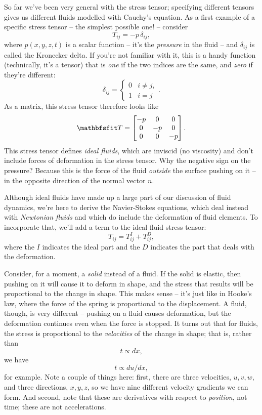 So far we've been very general with the stress tensor; specifying different tensors gives us different fluids modelled with Cauchy's equation.  As a first example of a specific stress tensor -- the simplest possible one! -- consider 
\begin{equation}
T_{ij} = -p \, \delta_{ij},
\end{equation}
where $p(x, y, z, t)$ is a scalar function -- it's the \emph{pressure} in the fluid -- and $\delta_{ij}$ is called the Kronecker delta.  If you're not familiar with it, this is a handy function (technically, it's a tensor) that is \emph{one} if the two indices are the same, and \emph{zero} if they're different:
\[
\delta_{ij} = \begin{cases}
0 & i \neq j, \\
1 & i = j \end{cases}.
\]
As a matrix, this stress tensor therefore looks like
\begin{equation}
\tens{T} = \begin{bmatrix}
-p & 0 & 0 \\
0 & -p & 0 \\
0 & 0 & -p
\end{bmatrix}.
\label{eq_stress_ideal}
\end{equation}
This stress tensor defines \emph{ideal fluids}, which are inviscid (no viscosity) and don't include forces of deformation in the stress tensor.  Why the negative sign on the pressure?  Because this is the force of the fluid \emph{outside} the surface pushing on it -- in the opposite direction of the normal vector $\unit{n}$.

Although ideal fluids have made up a large part of our discussion of fluid dynamics, we're here to derive the Navier-Stokes equations, which deal instead with \emph{Newtonian fluids} and which do include the deformation of fluid elements.  To incorporate that, we'll add a term to the ideal fluid stress tensor:
\begin{equation}
T_{ij} = T_{ij}^I + T_{ij}^D,
\end{equation}
where the $I$ indicates the ideal part and the $D$ indicates the part that deals with the deformation.  

Consider, for a moment, a \emph{solid} instead of a fluid.  If the solid is elastic, then pushing on it will cause it to deform in shape, and the stress that results will be proportional to the change in shape.  This makes sense -- it's just like in Hooke's law, where the force of the spring is proportional to the displacement.  A fluid, though, is very different -- pushing on a fluid causes deformation, but the deformation continues even when the force is stopped.  It turns out that for fluids, the stress is proportional to the \emph{velocities} of the change in shape; that is, rather than
\[
t \propto dx,
\]
we have
\[
t \propto du/dx,
\]
for example.  Note a couple of things here:  first, there are three velocities, $u, v, w$, and three directions, $x, y, z$, so we have nine different velocity gradients we can form.  And second, note that these are derivatives with respect to \emph{position}, not time; these are not accelerations.

